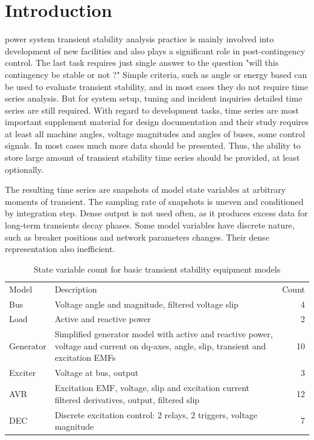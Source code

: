 \documentclass[lettersize,journal]{IEEEtran}
\begin{document}
\section{Introduction}
 power system transient stability analysis practice is mainly involved
into development of new facilities and also plays a significant role in post-contingency
control. The last task requires just single answer to the question "will this contingency be stable or not ?"
Simple criteria, such as angle or energy based can be used to evaluate transient stability, and in 
most cases they do not require time series analysis. But for system setup, tuning and incident inquiries
detailed time series are still required. With regard to development tasks, time series are most important
supplement material for design documentation and their study requires at least all machine angles, 
voltage magnitudes and angles of buses, some control signals. In most cases much more data should be presented. 
Thus, the ability to store large amount of transient stability time series should be provided, at least optionally.

The resulting time series are snapshots of model state variables at arbitrary moments of transient.
The sampling rate of snapshots is uneven and conditioned by integration step. Dense output is not used often, as it 
produces excess data for long-term transients decay phases. Some model variables have discrete nature, such
as breaker positions and network parameters changes. Their dense representation also inefficient.

\begin{table}[!h]
	\caption{State variable count for basic transient stability equipment models\label{tab:statvarscount}}
	\centering
	\begin{tabularx}{\columnwidth}{l|X|r}
		\hline
		Model & Description & Count\\
		\hlineB{3}	
		Bus & Voltage angle and magnitude, filtered voltage slip & 4\\
		\hline
		Load & Active and reactive power & 2\\
		\hline
		Generator & Simplified generator model with active and reactive power, voltage and current on dq-axes, 
		angle, slip, transient and excitation EMFs & 10\\
		\hline
		Exciter & Voltage at bus, output & 3\\
		\hline
		AVR & Excitation EMF, voltage, slip and excitation current filtered derivatives, output, filtered slip & 12\\
		\hline
		DEC & Discrete excitation control: 2 relays, 2 triggers, voltage magnitude & 7\\
		\hline
	\end{tabularx}
\end{table}
\end{document}
